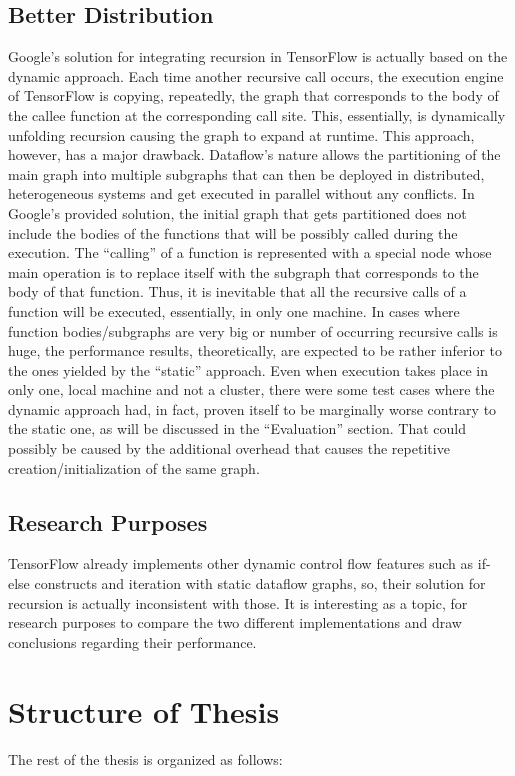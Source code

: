\documentclass[ack,preface]{dithesis}
\begin{document}
    \subsection{Better Distribution}
 Google's solution for integrating recursion in TensorFlow is actually based on the dynamic approach. Each time another recursive call occurs, the execution engine of TensorFlow is  copying, repeatedly, the graph that corresponds to the body of the callee function at the corresponding call site. This, essentially, is dynamically unfolding recursion causing the graph to expand at runtime. This approach, however, has a major drawback. Dataflow’s nature allows the partitioning of the main graph into multiple subgraphs that can then be deployed in distributed, heterogeneous systems and get executed in parallel without any conflicts. In Google’s provided solution, the initial graph that gets partitioned does not include the bodies of the functions that will be possibly called during the execution. The “calling” of a function is represented with a special node whose main operation is to replace itself with the subgraph that corresponds to the body of that function. Thus, it is inevitable that all the recursive calls of a function will be executed, essentially, in only one machine.  In cases where function bodies/subgraphs are very big or number of occurring recursive calls is huge, the performance results, theoretically, are expected to be rather inferior to the ones yielded by the “static” approach.
Even when execution takes place in only one, local machine and not a cluster, there were some test cases where the dynamic approach had, in fact, proven itself to be marginally worse contrary to the static one, as will be discussed in the “Evaluation” section. That could possibly be caused by the additional overhead that causes the repetitive creation/initialization of the same graph.


    \subsection{Research Purposes}
	TensorFlow already implements other dynamic control flow features such as if-else constructs and iteration with static dataflow graphs, so, their solution for recursion is actually inconsistent with those. It is interesting as a topic, for research purposes to compare the two different implementations and draw conclusions regarding their performance. 

    \section{Structure of Thesis}
The rest of the thesis is organized as follows:
\end{document}
